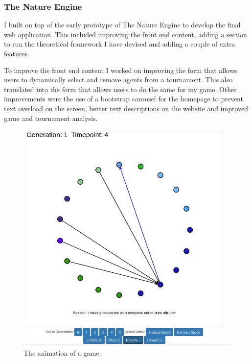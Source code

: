 \documentclass[]{final_report}
\begin{document}
\subsubsection{The Nature Engine}
I built on top of the early prototype of The Nature Engine to develop the final web application. This included improving the front end content, adding a section to run the theoretical framework I have devised and adding a couple of extra features.\par 
To improve the front end content I worked on improving the form that allows users to dynamically select and remove agents from a tournament. This also translated into the form that allows users to do the same for my game. Other improvements were the use of a bootstrap carousel for the homepage to prevent text overload on the screen, better text descriptions on the website and improved game and tournament analysis.\par 
\begin{figure}
\vspace{-30pt}
\begin{framed}
	\begin{center}
	\includegraphics[width=\textwidth]{Animation.png}
	\caption{The animation of a game.}
	\label{fig:animation}
	\end{center}
\end{framed}
\vspace{-30pt}
\end{figure}
\end{document}

